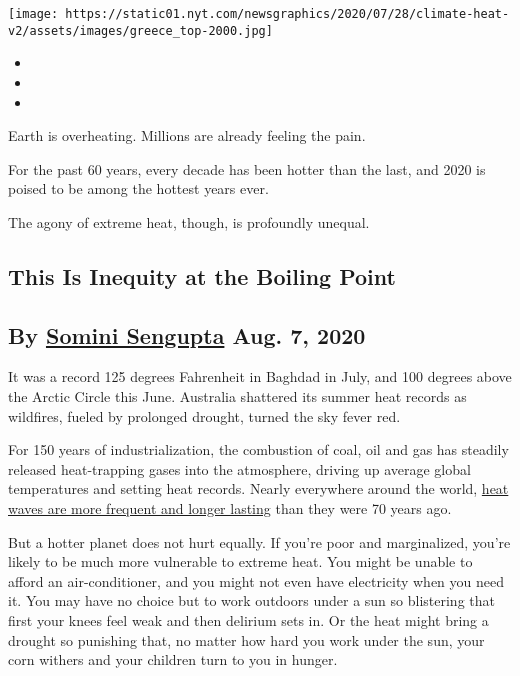 \texttt{[image: https://static01.nyt.com/newsgraphics/2020/07/28/climate-heat-v2/assets/images/greece\_top-2000.jpg]}

\begin{itemize}
\item
\item
\item
\end{itemize}

Earth is overheating. Millions are already feeling the pain.

For the past 60 years, every decade has been hotter than the last, and
2020 is poised to be among the hottest years ever.

The agony of extreme heat, though, is profoundly unequal.

\hypertarget{this-is-inequity-at-the-boiling-point}{%
\subsection{This Is Inequity at the Boiling
Point}\label{this-is-inequity-at-the-boiling-point}}

\hypertarget{-by-somini-sengupta-aug-7-2020}{%
\subsection{\texorpdfstring{ \textbf{By
\href{https://www.nytimes.com/by/somini-sengupta}{Somini Sengupta}} Aug.
7,
2020}{ By Somini Sengupta Aug. 7, 2020}}\label{-by-somini-sengupta-aug-7-2020}}

It was a record 125 degrees Fahrenheit in Baghdad in July, and 100
degrees above the Arctic Circle this June. Australia shattered its
summer heat records as wildfires, fueled by prolonged drought, turned
the sky fever red.

For 150 years of industrialization, the combustion of coal, oil and gas
has steadily released heat-trapping gases into the atmosphere, driving
up average global temperatures and setting heat records. Nearly
everywhere around the world,
\href{https://climateextremes.org.au/heatwave-trends-accelerate-worldwide/}{heat
waves are more frequent and longer lasting} than they were 70 years ago.

But a hotter planet does not hurt equally. If you're poor and
marginalized, you're likely to be much more vulnerable to extreme heat.
You might be unable to afford an air-conditioner, and you might not even
have electricity when you need it. You may have no choice but to work
outdoors under a sun so blistering that first your knees feel weak and
then delirium sets in. Or the heat might bring a drought so punishing
that, no matter how hard you work under the sun, your corn withers and
your children turn to you in hunger.

